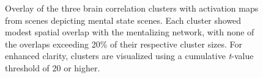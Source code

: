 \begin{figure}[!ht]
	\centering
	\caption{Overlay of the three brain correlation clusters with activation maps from scenes depicting mental state scenes. Each cluster showed modest spatial overlap with the mentalizing network, with none of the overlaps exceeding 20\% of their respective cluster sizes. For enhanced clarity, clusters are visualized using a cumulative \textit{t}-value threshold of 20 or higher.}
	\label{fig:isc-fmri-overlap-sa}
\end{figure}

